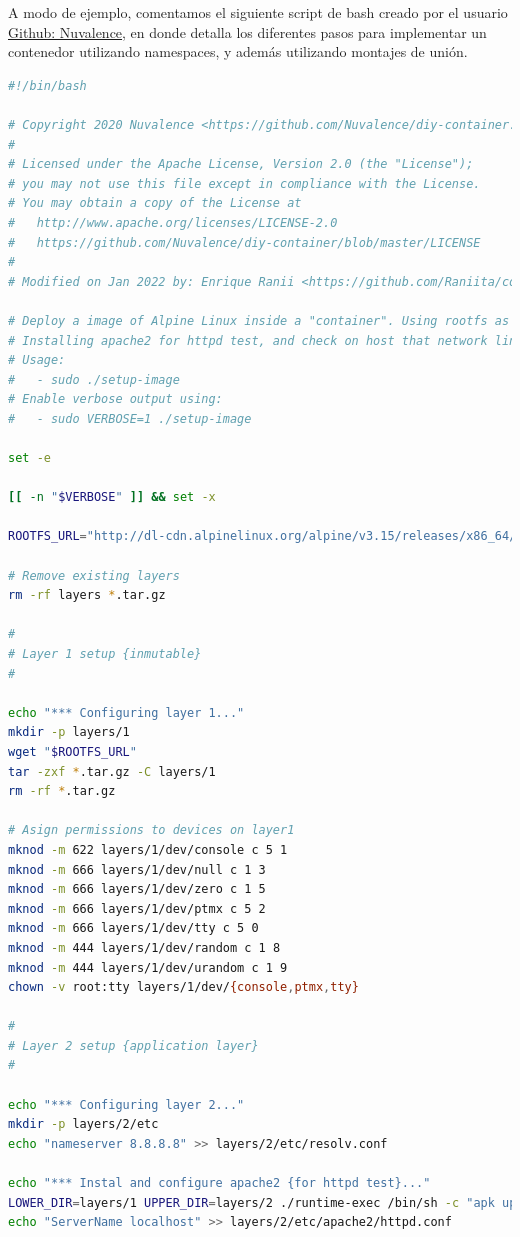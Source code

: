 \documentclass[12pt]{article}
\begin{document}
	\noindent A modo de ejemplo, comentamos el siguiente script de bash creado por el usuario \href{https://github.com/Nuvalence/diy-container}{Github: Nuvalence}, en donde detalla los diferentes pasos para implementar un contenedor utilizando namespaces, y además utilizando montajes de unión.
	
	\begin{lstlisting}[language=bash, caption={Creación de imagen para contenedor utilizando Alpine y union mounts}]
#!/bin/bash

# Copyright 2020 Nuvalence <https://github.com/Nuvalence/diy-container.git>
# 
# Licensed under the Apache License, Version 2.0 (the "License");
# you may not use this file except in compliance with the License.
# You may obtain a copy of the License at
#   http://www.apache.org/licenses/LICENSE-2.0
#   https://github.com/Nuvalence/diy-container/blob/master/LICENSE
#
# Modified on Jan 2022 by: Enrique Ranii <https://github.com/Raniita/container-alpine.git>

# Deploy a image of Alpine Linux inside a "container". Using rootfs as Union Filesystem
# Installing apache2 for httpd test, and check on host that network link is enabled
# Usage:
#   - sudo ./setup-image
# Enable verbose output using:
#   - sudo VERBOSE=1 ./setup-image

set -e

[[ -n "$VERBOSE" ]] && set -x

ROOTFS_URL="http://dl-cdn.alpinelinux.org/alpine/v3.15/releases/x86_64/alpine-minirootfs-3.15.0-x86_64.tar.gz"

# Remove existing layers
rm -rf layers *.tar.gz

#
# Layer 1 setup {inmutable}
#

echo "*** Configuring layer 1..."
mkdir -p layers/1
wget "$ROOTFS_URL"
tar -zxf *.tar.gz -C layers/1
rm -rf *.tar.gz

# Asign permissions to devices on layer1
mknod -m 622 layers/1/dev/console c 5 1
mknod -m 666 layers/1/dev/null c 1 3
mknod -m 666 layers/1/dev/zero c 1 5
mknod -m 666 layers/1/dev/ptmx c 5 2
mknod -m 666 layers/1/dev/tty c 5 0
mknod -m 444 layers/1/dev/random c 1 8
mknod -m 444 layers/1/dev/urandom c 1 9
chown -v root:tty layers/1/dev/{console,ptmx,tty}

#
# Layer 2 setup {application layer}
#

echo "*** Configuring layer 2..."
mkdir -p layers/2/etc
echo "nameserver 8.8.8.8" >> layers/2/etc/resolv.conf

echo "*** Instal and configure apache2 {for httpd test}..."
LOWER_DIR=layers/1 UPPER_DIR=layers/2 ./runtime-exec /bin/sh -c "apk update && apk add apache2"
echo "ServerName localhost" >> layers/2/etc/apache2/httpd.conf
	\end{lstlisting}
	
\end{document}
